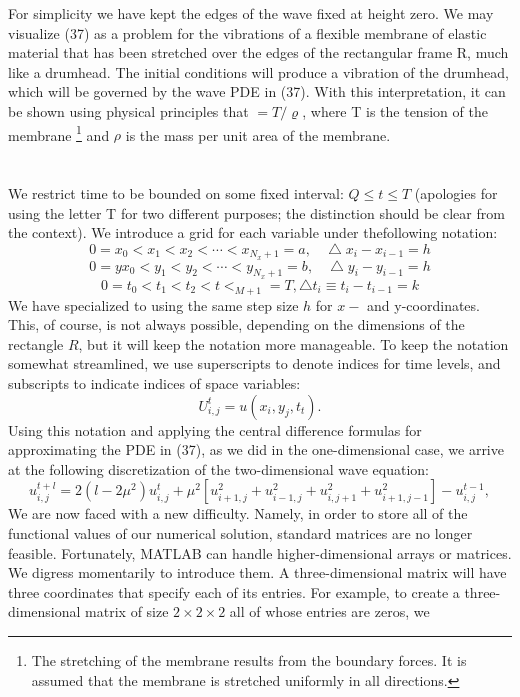 \documentclass[../main.tex]{subfiles}
\begin{document}
For simplicity we have kept the edges of the wave fixed at height zero. We may visualize (37) as a problem for the vibrations of a flexible membrane of elastic material that has been stretched over the edges of the rectangular frame R, much like a drumhead. The initial conditions will produce a vibration of the drumhead, which will be governed by the wave PDE in (37). With this interpretation, it can be shown using physical principles that $ = T/ \varrho$, where T is the tension of the membrane 
\footnote{ The stretching of the membrane results from the boundary forces. It is assumed that the membrane is 
stretched uniformly in all directions.}
and $\rho$ is the mass per unit area of the membrane. 
\\
\\
\\
We restrict time to be bounded on some fixed interval: $Q \leqslant t \leqslant T$ (apologies for using the letter T for two different purposes; the distinction should be clear from the context). We introduce a grid for each variable under thefollowing notation: 
$$0 = x_0 < x_1 < x_2< \cdots <x_{N_x +1}=a, ~~~~\bigtriangleup x_i-x_{i-1}=h$$
\begin{equation}\label{eqa38}
	0 =yx_0 < y_1 < y_2< \cdots <y_{N_x +1}=b, ~~~~\bigtriangleup y_i-y_{i-1}=h
\end{equation}
$$0= t_0 < t_1 < t_2 <t<_{M+1}=T, \bigtriangleup t_i \equiv t_i-t_{i-1}=k$$
We have specialized to using the same step size $h$ for $x-$ and y-coordinates. This, of course, is not always possible, depending on the dimensions of the rectangle $R$, but it will keep the notation more manageable. To keep the notation somewhat streamlined, we use superscripts to denote indices for time levels, and subscripts to indicate indices of space variables: 
$$U_{i,j}^t=u(x_i,y_j,t_t).$$
Using this notation and applying the central difference formulas for approximating the PDE in (37), as we did in the one-dimensional case, we arrive at the following discretization of the two-dimensional wave equation:
\begin{equation}\label{eqa39}
	u_{i,j}^{t+l}=2(l-2 \mu^2)u_{i,j}^t+\mu^2[u_{i+1,j}^2+u_{i-1,j}^2+u_{i,j+1}^2+u_{i+1,j-1}^2]-u_{i,j}^{t-1},
\end{equation}
We are now faced with a new difficulty. Namely, in order to store all of the functional values of our numerical solution, standard matrices are no longer feasible. Fortunately, MATLAB can handle higher-dimensional arrays or matrices. We digress momentarily to introduce them. A three-dimensional matrix will have three coordinates that specify each of its entries. For example, to create a three-dimensional matrix of size $2\times 2 \times 2$ all of whose entries are zeros, we 
\end{document}
